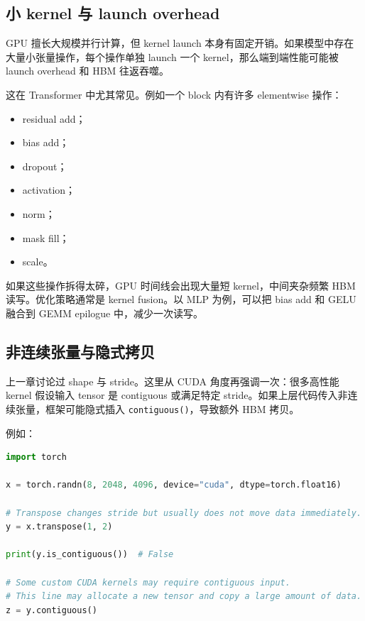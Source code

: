 \subsection{小 kernel 与 launch overhead}
\label{subsec:small-kernel-launch-overhead}

GPU 擅长大规模并行计算，但 kernel launch 本身有固定开销。如果模型中存在大量小张量操作，每个操作单独 launch 一个 kernel，那么端到端性能可能被 launch overhead 和 HBM 往返吞噬。

这在 Transformer 中尤其常见。例如一个 block 内有许多 elementwise 操作：

\begin{itemize}
  \item residual add；
  \item bias add；
  \item dropout；
  \item activation；
  \item norm；
  \item mask fill；
  \item scale。
\end{itemize}

如果这些操作拆得太碎，GPU 时间线会出现大量短 kernel，中间夹杂频繁 HBM 读写。优化策略通常是 kernel fusion。以 MLP 为例，可以把 bias add 和 GELU 融合到 GEMM epilogue 中，减少一次读写。

\subsection{非连续张量与隐式拷贝}
\label{subsec:non-contiguous-hidden-copy}

上一章讨论过 shape 与 stride。这里从 CUDA 角度再强调一次：很多高性能 kernel 假设输入 tensor 是 contiguous 或满足特定 stride。如果上层代码传入非连续张量，框架可能隐式插入 \texttt{contiguous()}，导致额外 HBM 拷贝。

例如：

\begin{lstlisting}[language=Python,caption={非连续张量可能触发额外拷贝},label={lst:non-contiguous-copy}]
import torch

x = torch.randn(8, 2048, 4096, device="cuda", dtype=torch.float16)

# Transpose changes stride but usually does not move data immediately.
y = x.transpose(1, 2)

print(y.is_contiguous())  # False

# Some custom CUDA kernels may require contiguous input.
# This line may allocate a new tensor and copy a large amount of data.
z = y.contiguous()
\end{lstlisting}

